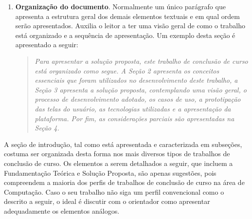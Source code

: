 \begin{enumerate}[resume]
\begin{enumerate}
    \item \textbf{Organização do documento}. Normalmente um único parágrafo que apresenta a estrutura geral dos demais elementos textuais e em qual ordem serão apresentados. Auxilia o leitor a ter uma visão geral de como o trabalho está organizado e a sequência de apresentação. Um exemplo desta seção é apresentado a seguir:
    \begin{quote}
    \emph{Para apresentar a solução proposta, este trabalho de conclusão de curso está organizado como segue. A Seção 2 apresenta os conceitos essenciais que foram utilizados no desenvolvimento deste trabalho, a Seção 3 apresenta a solução proposta, contemplando uma visão geral, o processo de desenvolvimento adotado, os casos de uso, a prototipação das telas do usuário, as tecnologias utilizadas e a apresentação da plataforma. Por fim, as considerações parciais são apresentadas na Seção 4.}
    \end{quote}
  \end{enumerate}
\end{enumerate}

A seção de introdução, tal como está apresentada e caracterizada em subseções, costuma ser organizada desta forma nos mais diversos tipos de trabalhos de conclusão de curso. Os elementos a serem detalhados a seguir, que incluem a Fundamentação Teórica e Solução Proposta, são apenas sugestões, pois compreendem a maioria dos perfis de trabalhos de conclusão de curso na área de Computação. Caso o seu trabalho não siga um perfil convencional como o descrito a seguir, o ideal é discutir com o orientador como apresentar adequadamente os elementos análogos.

